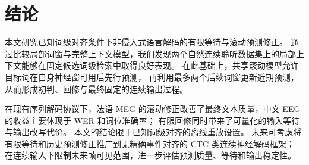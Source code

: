 \section{结论}

本文研究已知词级对齐条件下非侵入式语言解码的有限等待与滚动预测修正。
通过比较局部词窗与完整上下文模型，我们发现两个自然连续聆听数据集上的局部上下文能够在固定候选词级检索中取得良好表现。
在此基础上，共享滚动模型允许目标词在自身神经窗可用后先行预测，
再利用最多两个后续词窗更新近期预测，从而形成初判、回修与最终固定的连续输出过程。

在现有序列解码协议下，法语 MEG 的滚动修正改善了最终文本质量，中文 EEG 的收益主要体现于 WER 和词位准确率；
有限回修同时带来了可量化的输入等待与输出改写代价。
本文的结论限于已知词级对齐的离线重放设置。
未来可考虑将有限等待和历史预测修正推广到无精确事件对齐的 CTC 类连续神经解码框架；
在连续输入下限制未来帧可见范围，进一步评估预测质量、等待和输出稳定性。
